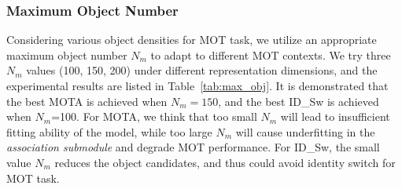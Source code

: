 \documentclass[acmsmall]{acmart}
\begin{document}
\subsubsection{{Maximum Object Number}} \label{sec:maximum_object}
{
Considering various object densities for MOT task, we utilize an appropriate maximum object number $N_m$ to adapt to different MOT contexts.
We try three $N_m$ values (100, 150, 200) under different representation dimensions, 
and the experimental results are listed in Table~\ref{tab:max_obj}.
It is demonstrated that the best MOTA is achieved when $N_m=150$, and the best ID\_Sw is achieved when $N_m$=100.
For MOTA, we think that too small $N_m$ will lead to insufficient fitting ability of the model, while too large $N_m$ will cause underfitting in the \emph{association submodule} and degrade MOT performance. 
For ID\_Sw, the small value $N_m$ reduces the object candidates, and thus could avoid identity switch for MOT task.
}




\end{document}
